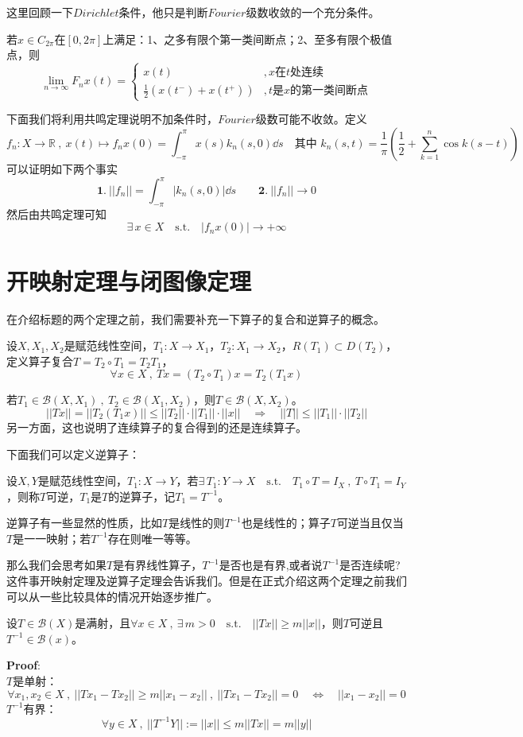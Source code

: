 这里回顾一下$Dirichlet$条件，他只是判断$Fourier$级数收敛的一个充分条件。
\begin{theorem}[$Dirichlet$条件]
    若$x \in C_{2\pi}$在$[0,2\pi]$上满足：1、之多有限个第一类间断点；2、至多有限个极值点，则
    \[\lim_{n \to \infty}F_nx(t)=\left\{
        \begin{array}{rl}
            x(t) & ,x\text{在}t\text{处连续} \\
            \frac{1}{2}(x(t^-)+x(t^+)) & ,t\text{是}x\text{的第一类间断点}
        \end{array}
    \right.\]
\end{theorem} 
下面我们将利用共鸣定理说明不加条件时，$Fourier$级数可能不收敛。定义
\[f_n:X \to \mathbb{R} \ , \ x(t) \mapsto f_nx(0)=\int_{-\pi}^{\pi}x(s)k_n(s,0) \dd s \quad \text{其中 }k_n(s,t)=\frac{1}{\pi}\left(\frac{1}{2}+\sum_{k=1}^n\cos k(s-t)\right)\]
可以证明如下两个事实
\[\mathbf{1.} \ ||f_n||=\int_{-\pi}^{\pi}|k_n(s,0)| \dd s \qquad \mathbf{2.} \ ||f_n|| \to 0\]
然后由共鸣定理可知
\[\exists \, x \in X \quad \text{s.t.} \quad |f_nx(0)| \to +\infty\]

\section{开映射定理与闭图像定理}\label{kb}
在介绍标题的两个定理之前，我们需要补充一下算子的复合和逆算子的概念。
\begin{definition}[算子复合(乘法)]
    设$X,X_1,X_2$是赋范线性空间，$T_1:X \to X_1$，$T_2:X_1 \to X_2$，$R(T_1) \subset D(T_2)$，定义算子复合$T=T_2 \circ T_1=T_2T_1$，
    \[\forall x \in X \ , \ Tx=(T_2 \circ T_1)x=T_2(T_1x)\]
\end{definition}
若$T_1 \in \mathscr{B}(X,X_1) \ , \ T_2 \in \mathscr{B}(X_1,X_2)$，则$T \in \mathscr{B}(X,X_2)$。
\[||Tx||=||T_2(T_1x)|| \leq ||T_2||\cdot||T_1||\cdot||x|| \quad \Rightarrow \quad ||T|| \leq ||T_1||\cdot||T_2||\]
另一方面，这也说明了连续算子的复合得到的还是连续算子。

下面我们可以定义逆算子：
\begin{definition}[逆算子]
    设$X,Y$是赋范线性空间，$T_1:X \to Y$，若$\exists \, T_1:Y \to X \quad \text{s.t.} \quad T_1 \circ T=I_X \ , \ T \circ T_1=I_Y$，则称$T$可逆，$T_1$是$T$的逆算子，记$T_1=T^{-1}$。
\end{definition}
逆算子有一些显然的性质，比如$T$是线性的则$T^{-1}$也是线性的；算子$T$可逆当且仅当$T$是一一映射；若$T^{-1}$存在则唯一等等。

那么我们会思考如果$T$是有界线性算子，$T^{-1}$是否也是有界,或者说$T^{-1}$是否连续呢?这件事开映射定理及逆算子定理会告诉我们。但是在正式介绍这两个定理之前我们可以从一些比较具体的情况开始逐步推广。
\begin{theorem}
    设$T \in \mathscr{B}(X)$是满射，且$\forall x \in X \ , \ \exists \, m>0 \quad \text{s.t.} \quad ||Tx|| \geq m||x||$，则$T$可逆且$T^{-1} \in \mathscr{B}(x)$。
\end{theorem} 
\textbf{Proof}:\\
$T$是单射：
\[\forall x_1,x_2 \in X \ , \ ||Tx_1-Tx_2|| \geq m||x_1-x_2|| \ , \ ||Tx_1-Tx_2||=0 \quad \Leftrightarrow \quad ||x_1-x_2||=0\]
$T^{-1}$有界：
\[\forall y \in X \ , \ ||T^{-1}Y||:=||x|| \leq m||Tx||=m||y||\]

